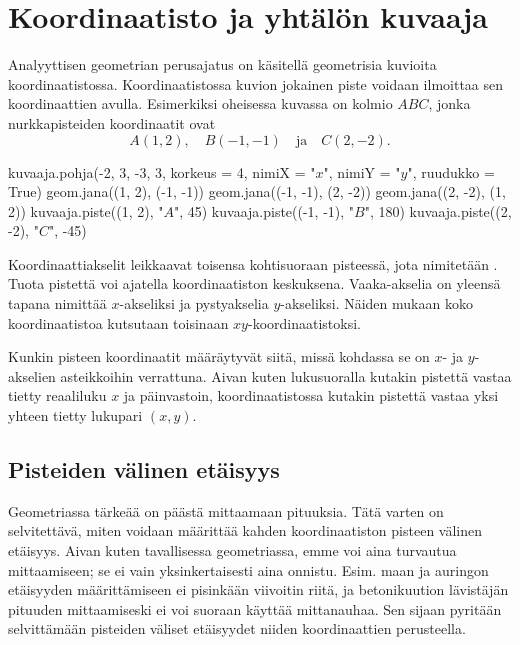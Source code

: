 \section{Koordinaatisto ja yhtälön kuvaaja}


Analyyttisen geometrian perusajatus on käsitellä geometrisia kuvioita koordinaatistossa.
Koordinaatistossa kuvion jokainen piste voidaan ilmoittaa sen koordinaattien avulla.
Esimerkiksi oheisessa kuvassa on kolmio $ABC$, jonka nurkkapisteiden koordinaatit ovat
\[
A(1, 2), \quad B(-1, -1) \quad \text{ja} \quad C(2, -2).
\]

\begin{kuva}
    kuvaaja.pohja(-2, 3, -3, 3, korkeus = 4, nimiX = "$x$", nimiY = "$y$", ruudukko = True)
    geom.jana((1, 2), (-1, -1))
    geom.jana((-1, -1), (2, -2))
    geom.jana((2, -2), (1, 2))
    kuvaaja.piste((1, 2), "$A$", 45)
    kuvaaja.piste((-1, -1), "$B$", 180)
    kuvaaja.piste((2, -2), "$C$", -45)
\end{kuva}

Koordinaattiakselit leikkaavat toisensa kohtisuoraan pisteessä, jota nimitetään .
Tuota pistettä voi ajatella koordinaatiston keskuksena.
Vaaka-akselia on yleensä tapana nimittää $x$-akseliksi ja pystyakselia $y$-akseliksi.
Näiden mukaan koko koordinaatistoa kutsutaan toisinaan $xy$-koordinaatistoksi.

Kunkin pisteen koordinaatit määräytyvät siitä, missä kohdassa se on $x$- ja $y$-akselien asteikkoihin verrattuna.
Aivan kuten lukusuoralla kutakin pistettä vastaa tietty reaaliluku $x$ ja päinvastoin, koordinaatistossa kutakin pistettä vastaa yksi yhteen tietty lukupari $(x, y)$.

\subsection{Pisteiden välinen etäisyys}

Geometriassa tärkeää on päästä mittaamaan pituuksia.
Tätä varten on selvitettävä, miten voidaan määrittää kahden koordinaatiston pisteen välinen etäisyys.
Aivan kuten tavallisessa geometriassa, emme voi aina turvautua mittaamiseen; se ei vain yksinkertaisesti aina onnistu. Esim. maan ja auringon etäisyyden määrittämiseen ei pisinkään viivoitin riitä, ja betonikuution lävistäjän pituuden mittaamiseski ei voi suoraan käyttää mittanauhaa. Sen sijaan pyritään selvittämään pisteiden väliset etäisyydet niiden koordinaattien perusteella.

